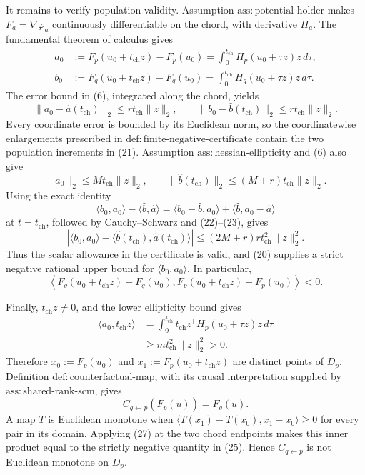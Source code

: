 It remains to verify population validity.  Assumption \(\mathrm{ass:potential\text{-}holder}\) makes \(F_a=\nabla\varphi_a\) continuously differentiable on the chord, with derivative \(H_a\).  The fundamental theorem of calculus gives
\[
 \begin{aligned}
 a_0&:=F_p(u_0+t_{\mathrm{ch}}z)-F_p(u_0)
 =\int_0^{t_{\mathrm{ch}}}H_p(u_0+\tau z)z\,d\tau,\\
 b_0&:=F_q(u_0+t_{\mathrm{ch}}z)-F_q(u_0)
 =\int_0^{t_{\mathrm{ch}}}H_q(u_0+\tau z)z\,d\tau.
 \end{aligned}
 \tag{21}
\]
The error bound in (6), integrated along the chord, yields
\[
 \lVert a_0-\widehat a(t_{\mathrm{ch}})\rVert_2
 \le rt_{\mathrm{ch}}\lVert z\rVert_2,
 \qquad
 \lVert b_0-\widehat b(t_{\mathrm{ch}})\rVert_2
 \le rt_{\mathrm{ch}}\lVert z\rVert_2.
 \tag{22}
\]
Every coordinate error is bounded by its Euclidean norm, so the coordinatewise enlargements prescribed in \(\mathrm{def:finite\text{-}negative\text{-}certificate}\) contain the two population increments in (21).  Assumption \(\mathrm{ass:hessian\text{-}ellipticity}\) and (6) also give
\[
 \lVert a_0\rVert_2\le Mt_{\mathrm{ch}}\lVert z\rVert_2,
 \qquad
 \lVert\widehat b(t_{\mathrm{ch}})\rVert_2
 \le(M+r)t_{\mathrm{ch}}\lVert z\rVert_2.
 \tag{23}
\]
Using the exact identity
\[
 \langle b_0,a_0\rangle-
 \langle\widehat b,\widehat a\rangle
 =\langle b_0-\widehat b,a_0\rangle
  +\langle\widehat b,a_0-\widehat a\rangle
\]
at \(t=t_{\mathrm{ch}}\), followed by Cauchy--Schwarz and (22)--(23), gives
\[
 \left|\langle b_0,a_0\rangle-
 \langle\widehat b(t_{\mathrm{ch}}),
          \widehat a(t_{\mathrm{ch}})\rangle\right|
 \le(2M+r)r t_{\mathrm{ch}}^2\lVert z\rVert_2^2.
 \tag{24}
\]
Thus the scalar allowance in the certificate is valid, and (20) supplies a strict negative rational upper bound for \(\langle b_0,a_0\rangle\).  In particular,
\[
 \left\langle F_q(u_0+t_{\mathrm{ch}}z)-F_q(u_0),
 F_p(u_0+t_{\mathrm{ch}}z)-F_p(u_0)\right\rangle<0.
 \tag{25}
\]

Finally, \(t_{\mathrm{ch}}z\ne0\), and the lower ellipticity bound gives
\[
 \begin{aligned}
 \langle a_0,t_{\mathrm{ch}}z\rangle
 &=\int_0^{t_{\mathrm{ch}}}
 t_{\mathrm{ch}}z^{\mathsf T}H_p(u_0+\tau z)z\,d\tau\\
 &\ge m t_{\mathrm{ch}}^2\lVert z\rVert_2^2>0.
 \end{aligned}
 \tag{26}
\]
Therefore \(x_0:=F_p(u_0)\) and \(x_1:=F_p(u_0+t_{\mathrm{ch}}z)\) are distinct points of \(D_p\).  Definition \(\mathrm{def:counterfactual\text{-}map}\), with its causal interpretation supplied by \(\mathrm{ass:shared\text{-}rank\text{-}scm}\), gives
\[
 C_{q\leftarrow p}(F_p(u))=F_q(u).
 \tag{27}
\]
A map \(T\) is Euclidean monotone when \(\langle T(x_1)-T(x_0),x_1-x_0\rangle\ge0\) for every pair in its domain.  Applying (27) at the two chord endpoints makes this inner product equal to the strictly negative quantity in (25).  Hence \(C_{q\leftarrow p}\) is not Euclidean monotone on \(D_p\).
